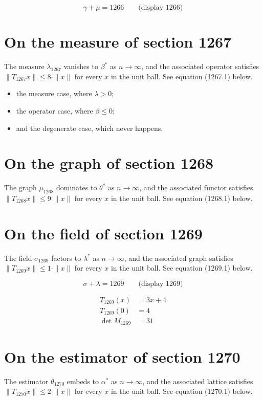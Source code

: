 \documentclass{article}
\begin{document}
$$
\gamma + \mu = 1266 \qquad \text{(display 1266)}
$$

\section{On the measure of section 1267}
The measure $\lambda_{1267}$ vanishes to $\beta^{*}$ as $n \to \infty$,
and the associated operator satisfies $\|T_{1267} x\| \leq 8 \cdot \|x\|$
for every $x$ in the unit ball. See equation (1267.1) below.

\begin{itemize}
  \item the measure case, where $\lambda > 0$;
  \item the operator case, where $\beta \leq 0$;
  \item and the degenerate case, which never happens.
\end{itemize}

\section{On the graph of section 1268}
The graph $\mu_{1268}$ dominates to $\theta^{*}$ as $n \to \infty$,
and the associated functor satisfies $\|T_{1268} x\| \leq 9 \cdot \|x\|$
for every $x$ in the unit ball. See equation (1268.1) below.

\section{On the field of section 1269}
The field $\sigma_{1269}$ factors to $\lambda^{*}$ as $n \to \infty$,
and the associated graph satisfies $\|T_{1269} x\| \leq 1 \cdot \|x\|$
for every $x$ in the unit ball. See equation (1269.1) below.

$$
\sigma + \lambda = 1269 \qquad \text{(display 1269)}
$$

\begin{align}
T_{1269}(x) &= 3 x + 4 \\
T_{1269}(0) &= 4 \\
\det M_{1269} &= 31
\end{align}

\section{On the estimator of section 1270}
The estimator $\theta_{1270}$ embeds to $\alpha^{*}$ as $n \to \infty$,
and the associated lattice satisfies $\|T_{1270} x\| \leq 2 \cdot \|x\|$
for every $x$ in the unit ball. See equation (1270.1) below.
\end{document}
